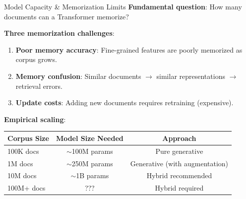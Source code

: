 \documentclass[aspectratio=169,11pt]{beamer}
\begin{document}
\begin{frame}{Model Capacity \& Memorization Limits}
\textbf{Fundamental question}: How many documents can a Transformer memorize?

\vspace{0.3cm}
\textbf{Three memorization challenges}:
\begin{enumerate}
    \item \textbf{Poor memory accuracy}: Fine-grained features are poorly memorized as corpus grows.
    \item \textbf{Memory confusion}: Similar documents $\to$ similar representations $\to$ retrieval errors.
    \item \textbf{Update costs}: Adding new documents requires retraining (expensive).
\end{enumerate}

\vspace{0.4cm}
\textbf{Empirical scaling}:
\begin{center}
\begin{tabular}{lcc}
\toprule
\textbf{Corpus Size} & \textbf{Model Size Needed} & \textbf{Approach} \\
\midrule
100K docs & $\sim$100M params & Pure generative \\
1M docs & $\sim$250M params & Generative (with augmentation) \\
10M docs & $\sim$1B params & Hybrid recommended \\
100M+ docs & ??? & Hybrid required \\
\bottomrule
\end{tabular}
\end{center}
\end{frame}

\end{document}
